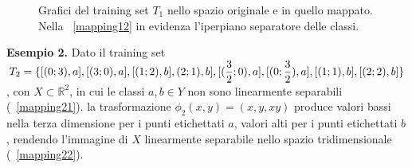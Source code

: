 \documentclass [11pt,a4paper,twoside,openright] {book}
\begin{document}
\begin{figure}[!h]
        \centering%
        \qquad\qquad
          \caption{Grafici del training set $T_1$ nello spazio originale e in quello mappato. Nella \figurename~\ref{mapping12} in evidenza l'iperpiano separatore delle classi.}
\end{figure}
\linebreak
\textbf{Esempio 2.} Dato il training set $T_2=\lbrace [(0;3),a], [(3;0),a], [(1;2),b], \linebreak (2;1),b], [(\dfrac{3}{2};0),a], [(0;\dfrac{3}{2}),a], [(1;1),b], [(2;2),b] \rbrace$, con $X \subset \mathbb{R}^2$, in cui le classi $a, b \in Y$ non sono linearmente separabili (\figurename~\ref{mapping21}). la trasformazione $\phi_2(x,y)=(x,y,xy)$ produce valori bassi nella terza dimensione per i punti etichettati $a$, valori alti per i punti etichettati $b$, rendendo l'immagine di $X$ linearmente separabile nello spazio tridimensionale (\figurename~\ref{mapping22}).
\end{document}
